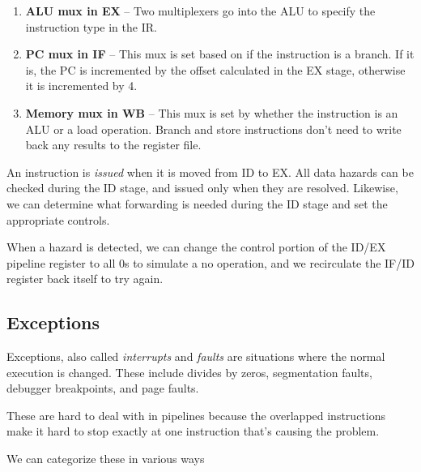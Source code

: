 \documentclass{article}
\begin{document}
\begin{enumerate}
\item \textbf{ALU mux in EX} -- Two multiplexers go into the ALU to specify the instruction type in the IR. 

\item \textbf{PC mux in IF} -- This mux is set based on if the instruction is a branch. If it is, the PC is incremented by the offset calculated in the EX stage, otherwise it is incremented by 4.

\item \textbf{Memory mux in WB} -- This mux is set by whether the instruction is an ALU or a load operation. Branch and store instructions don't need to write back any results to the register file.

\end{enumerate}


An instruction is \textit{issued} when it is moved from ID to EX. All data hazards can be checked during the ID stage, and issued only when they are resolved. Likewise, we can determine what forwarding is needed during the ID stage and set the appropriate controls.

When a hazard is detected, we can change the control portion of the ID/EX pipeline register to all 0s to simulate a no operation, and we recirculate the IF/ID register back itself to try again. 

\subsection{Exceptions}

Exceptions, also called \textit{interrupts} and \textit{faults} are situations where the normal execution is changed. These include divides by zeros, segmentation faults, debugger breakpoints, and page faults.

These are hard to deal with in pipelines because the overlapped instructions  make it hard to stop exactly at one instruction that's causing the problem.

We can categorize these in various ways
\end{document}
